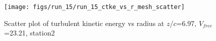 \begin{figure}[H]
\centering
\texttt{[image: figs/run\_15/run\_15\_ctke\_vs\_r\_mesh\_scatter]}
\caption{Scatter plot of turbulent kinetic energy vs radius at $z/c$=6.97, $V_{free}$=23.21, station2}
\label{fig:run_15_ctke_vs_r_mesh_scatter}
\end{figure}


